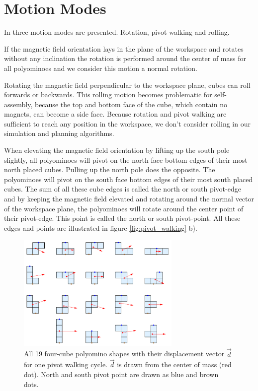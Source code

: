 \section{Motion Modes}
In \cite{Bhattacharjee2022} three motion modes are presented. Rotation, pivot walking and rolling.

If the magnetic field orientation lays in the plane of the workspace and rotates without any inclination the rotation is performed around the center of mass for all polyominoes and we consider this motion a normal rotation.

Rotating the magnetic field perpendicular to the workspace plane, cubes can roll forwards or backwards.
This rolling motion becomes problematic for self-assembly, because the top and bottom face of the cube, which contain no magnets, can become a side face.
Because rotation and pivot walking are sufficient to reach any position in the workspace, we don't consider rolling in our simulation and planning algorithms.

When elevating the magnetic field orientation by lifting up the south pole slightly, all polyominoes will pivot on the north face bottom edges of their most north placed cubes.
Pulling up the north pole does the opposite. The polyominoes will pivot on the south face bottom edges of their most south placed cubes.
The sum of all these cube edges is called the north or south pivot-edge and by keeping the magnetic field elevated and rotating around the normal vector of the workspace plane, the polyominoes will rotate around the center point of their pivot-edge.
This point is called the north or south pivot-point.
All these edges and points are illustrated in figure \ref{fig:pivot_walking} b).

\begin{figure}
	\centering
	\includegraphics[width=0.70\textwidth]{figures/displacement_pivot_walking.png}
	\caption{All 19 four-cube polyomino shapes with their displacement vector $\vec{d}$ for one pivot walking cycle. $\vec{d}$ is drawn from the center of mass (red dot). North and south pivot point are drawn as blue and brown dots.}
	\label{fig:displacement_pivot_walking}
\end{figure}

